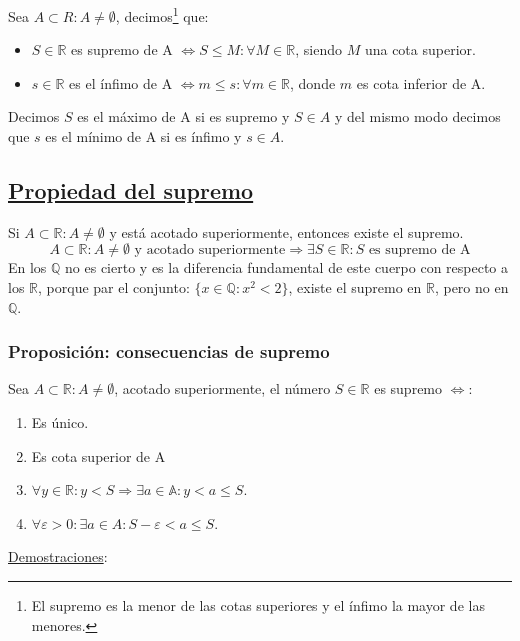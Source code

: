 \documentclass[10pt,a4paper,openright]{book}
\theoremstyle{break}
\begin{document}
Sea $A\subset R: A\neq \emptyset$, decimos\footnote{El supremo es la menor de las cotas superiores y el ínfimo la mayor de las menores.} que:
\begin{itemize}
\item $S\in \mathbb R$ es supremo de A $\Leftrightarrow S\leq M: \forall M\in \mathbb R$, siendo $M$ una cota superior.

\item $s\in \mathbb R$ es el ínfimo de A $\Leftrightarrow m\leq s: \forall m\in \mathbb R$, donde $m$ es cota inferior de A.
\end{itemize}\par

Decimos $S$ es el máximo de A si es supremo y $S\in A$ y del mismo modo decimos que $s$ es el mínimo de A si es ínfimo y $s\in A$.

\subsection{\underline{Propiedad del supremo}}
Si $A\subset \mathbb R: A\neq \emptyset$ y está acotado superiormente, entonces existe el supremo.
$$A\subset \mathbb R: A\neq \emptyset \mbox{ y acotado superiormente}\Rightarrow \exists S\in \mathbb R: S\mbox{ es supremo de A}$$
En los $\mathbb Q$ no es cierto y es la diferencia fundamental de este cuerpo con respecto a los $\mathbb R$, porque par el conjunto: $\{x\in \mathbb Q: x^2 < 2\}$, existe el supremo en $\mathbb R$, pero no en $\mathbb Q$.

\subsubsection{Proposición: consecuencias de supremo}
Sea $A\subset \mathbb R: A\neq \emptyset$, acotado superiormente, el número $S\in \mathbb R$ es supremo $\Leftrightarrow$:
\begin{enumerate}
\item  Es único.
\item Es cota superior de A
\item $\forall y\in \mathbb R: y<S\Rightarrow \exists a\in \mathbb A: y<a\leq S$.
\item $\forall \varepsilon>0: \exists a\in A: S- \varepsilon <a\leq S$.
\end{enumerate}

\underline{Demostraciones}:
\end{document}
